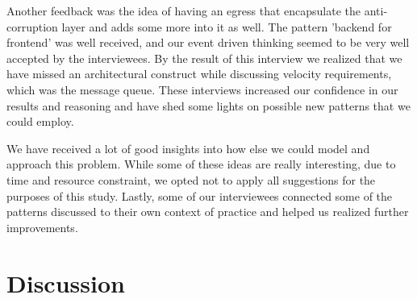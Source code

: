 \documentclass{bmcart}
\begin{document}
Another feedback was the idea of having an egress that encapsulate the anti-corruption layer and adds some more into it as well. The pattern 'backend for frontend' was well received, and our event driven thinking seemed to be very well accepted by the interviewees. By the result of this interview we realized that we have missed an architectural construct while discussing velocity requirements, which was the message queue. These interviews increased our confidence in our results and reasoning and have shed some lights on possible new patterns that we could employ.

We have received a lot of good insights into how else we could model and approach this problem. While some of these ideas are really interesting, due to time and resource constraint, we opted not to apply all suggestions for the purposes of this study. Lastly, some of our interviewees connected some of the patterns discussed to their own context of practice and helped us realized further improvements. 

\section{Discussion}


\end{document}
